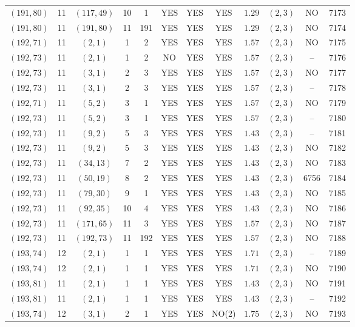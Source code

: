 \begin{longtable}{|c|c|c|c|c|c|c|c|c|c|c|c|}
$(191,80)$ & 11 & $(117,49)$ & 10 & 1 & YES & YES & YES & $1.29$ & $(2,3)$ & NO & 7173\\
$(191,80)$ & 11 & $(191,80)$ & 11 & 191 & YES & YES & YES & $1.29$ & $(2,3)$ & NO & 7174\\
$(192,71)$ & 11 & $(2,1)$ & 1 & 2 & YES & YES & YES & $1.57$ & $(2,3)$ & NO & 7175\\
$(192,73)$ & 11 & $(2,1)$ & 1 & 2 & NO & YES & YES & $1.57$ & $(2,3)$ & -- & 7176\\
$(192,73)$ & 11 & $(3,1)$ & 2 & 3 & YES & YES & YES & $1.57$ & $(2,3)$ & NO & 7177\\
$(192,73)$ & 11 & $(3,1)$ & 2 & 3 & YES & YES & YES & $1.57$ & $(2,3)$ & -- & 7178\\
$(192,71)$ & 11 & $(5,2)$ & 3 & 1 & YES & YES & YES & $1.57$ & $(2,3)$ & NO & 7179\\
$(192,73)$ & 11 & $(5,2)$ & 3 & 1 & YES & YES & YES & $1.57$ & $(2,3)$ & -- & 7180\\
$(192,73)$ & 11 & $(9,2)$ & 5 & 3 & YES & YES & YES & $1.43$ & $(2,3)$ & -- & 7181\\
$(192,73)$ & 11 & $(9,2)$ & 5 & 3 & YES & YES & YES & $1.43$ & $(2,3)$ & NO & 7182\\
$(192,73)$ & 11 & $(34,13)$ & 7 & 2 & YES & YES & YES & $1.43$ & $(2,3)$ & NO & 7183\\
$(192,73)$ & 11 & $(50,19)$ & 8 & 2 & YES & YES & YES & $1.43$ & $(2,3)$ & 6756 & 7184\\
$(192,73)$ & 11 & $(79,30)$ & 9 & 1 & YES & YES & YES & $1.43$ & $(2,3)$ & NO & 7185\\
$(192,73)$ & 11 & $(92,35)$ & 10 & 4 & YES & YES & YES & $1.43$ & $(2,3)$ & NO & 7186\\
$(192,73)$ & 11 & $(171,65)$ & 11 & 3 & YES & YES & YES & $1.57$ & $(2,3)$ & NO & 7187\\
$(192,73)$ & 11 & $(192,73)$ & 11 & 192 & YES & YES & YES & $1.57$ & $(2,3)$ & NO & 7188\\
$(193,74)$ & 12 & $(2,1)$ & 1 & 1 & YES & YES & YES & $1.71$ & $(2,3)$ & -- & 7189\\
$(193,74)$ & 12 & $(2,1)$ & 1 & 1 & YES & YES & YES & $1.71$ & $(2,3)$ & NO & 7190\\
$(193,81)$ & 11 & $(2,1)$ & 1 & 1 & YES & YES & YES & $1.43$ & $(2,3)$ & NO & 7191\\
$(193,81)$ & 11 & $(2,1)$ & 1 & 1 & YES & YES & YES & $1.43$ & $(2,3)$ & -- & 7192\\
$(193,74)$ & 12 & $(3,1)$ & 2 & 1 & YES & YES & NO(2) & $1.75$ & $(2,3)$ & NO & 7193\\

\end{longtable}
